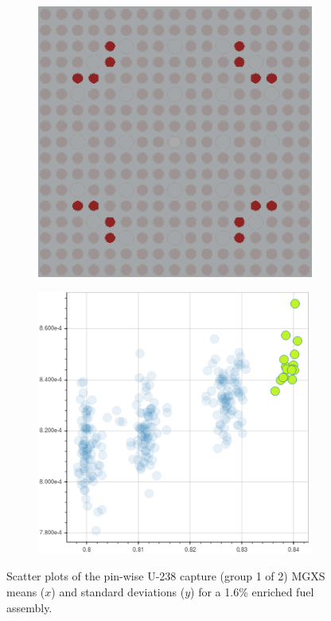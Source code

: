 \documentclass[12pt,twoside]{mitthesis-exec}
\begin{document}
\begin{figure}[h!]
\begin{subfigure}{0.45\textwidth}
  \caption{}
  \label{fig:capt-mean-std-mgxs-2}
\end{subfigure}
\begin{subfigure}{0.45\textwidth}
  \centering
  \includegraphics[width=0.9\linewidth]{figures/unsupervised/features/assm-16/u238-capt/mean-std/geometry-3}
  \caption{}
  \label{fig:capt-mean-std-geom-3}
\end{subfigure}%
\begin{subfigure}{0.45\textwidth}
  \centering
  \includegraphics[width=0.9\linewidth]{figures/unsupervised/features/assm-16/u238-capt/mean-std/mgxs-3}
  \caption{}
  \label{fig:capt-mean-std-mgxs-3}
\end{subfigure}
\caption[Clustering of U-238 capture MGXS standard deviations]{Scatter plots of the pin-wise U-238 capture (group 1 of 2) MGXS means ($x$) and standard deviations ($y$) for a 1.6\% enriched fuel assembly.}
\label{fig:capt-mean-std}
\end{figure}
\end{document}
